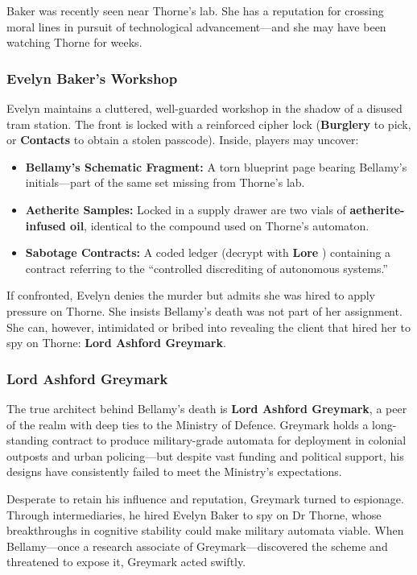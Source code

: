 Baker was recently seen near Thorne’s lab. She has a reputation for crossing moral lines in pursuit of technological advancement—and she may have been watching Thorne for weeks.

\subsubsection*{Evelyn Baker’s Workshop}

Evelyn maintains a cluttered, well-guarded workshop in the shadow of a disused tram station. The front is locked with a reinforced cipher lock (\textbf{Burglery}  to pick, or \textbf{Contacts}  to obtain a stolen passcode). Inside, players may uncover:

\begin{itemize}
  \item \textbf{Bellamy’s Schematic Fragment:} A torn blueprint page bearing Bellamy’s initials—part of the same set missing from Thorne’s lab.
  \item \textbf{Aetherite Samples:} Locked in a supply drawer are two vials of \textbf{aetherite-infused oil}, identical to the compound used on Thorne’s automaton.
  \item \textbf{Sabotage Contracts:} A coded ledger (decrypt with \textbf{Lore} ) containing a contract referring to the “controlled discrediting of autonomous systems.”
\end{itemize}

If confronted, Evelyn denies the murder but admits she was hired to apply pressure on Thorne. She insists Bellamy’s death was not part of her assignment. She can, however, intimidated or bribed into revealing the client that hired her to spy on Thorne: \textbf{Lord Ashford Greymark}.

\subsubsection*{Lord Ashford Greymark}

The true architect behind Bellamy’s death is \textbf{Lord Ashford Greymark}, a peer of the realm with deep ties to the Ministry of Defence. Greymark holds a long-standing contract to produce military-grade automata for deployment in colonial outposts and urban policing—but despite vast funding and political support, his designs have consistently failed to meet the Ministry’s expectations.

Desperate to retain his influence and reputation, Greymark turned to espionage. Through intermediaries, he hired Evelyn Baker to spy on Dr Thorne, whose breakthroughs in cognitive stability could make military automata viable. When Bellamy—once a research associate of Greymark—discovered the scheme and threatened to expose it, Greymark acted swiftly.


